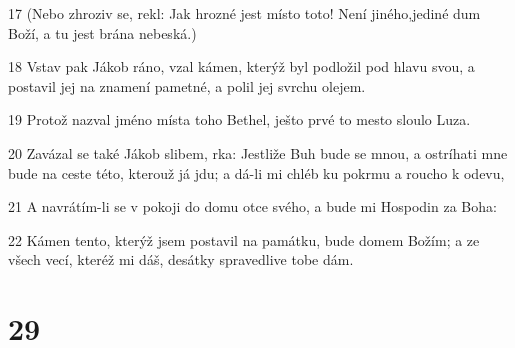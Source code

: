 \par 17 (Nebo zhroziv se, rekl: Jak hrozné jest místo toto! Není jiného,jediné dum Boží, a tu jest brána nebeská.)
\par 18 Vstav pak Jákob ráno, vzal kámen, kterýž byl podložil pod hlavu svou, a postavil jej na znamení pametné, a polil jej svrchu olejem.
\par 19 Protož nazval jméno místa toho Bethel, ješto prvé to mesto sloulo Luza.
\par 20 Zavázal se také Jákob slibem, rka: Jestliže Buh bude se mnou, a ostríhati mne bude na ceste této, kterouž já jdu; a dá-li mi chléb ku pokrmu a roucho k odevu,
\par 21 A navrátím-li se v pokoji do domu otce svého, a bude mi Hospodin za Boha:
\par 22 Kámen tento, kterýž jsem postavil na památku, bude domem Božím; a ze všech vecí, kteréž mi dáš, desátky spravedlive tobe dám.

\chapter{29}

